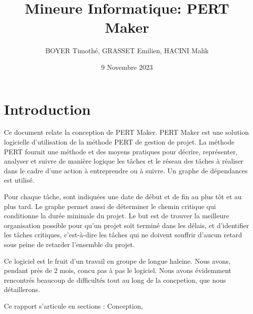 \documentclass{article}
\title{\centering Mineure Informatique: 
PERT Maker}
\author{BOYER Timothé, GRASSET Emilien, HACINI Malik}
\date{9 Novembre 2023}
\begin{document}
    
    
    
    \maketitle
    \tableofcontents{}
    
    \section{Introduction}
    
    Ce document relate la conception de PERT Maker.
    PERT Maker est une solution logicielle d'utilisation de la méthode PERT de gestion de projet.
    La méthode PERT fournit une méthode et des moyens pratiques pour décrire,
    représenter, analyser et suivre de manière logique les tâches et le réseau des tâches à réaliser dans le cadre d'une 
    action à entreprendre ou à suivre.
    Un graphe de dépendances est utilisé. 
    
    Pour chaque tâche, sont indiquées une date de début et de fin au plus tôt et au plus tard. 
    Le graphe permet aussi de déterminer le chemin critique qui conditionne la durée minimale du projet.
    Le but est de trouver la meilleure organisation possible pour qu'un projet soit terminé dans les délais, et d'identifier les tâches critiques, 
    c'est-à-dire les tâches qui ne doivent souffrir d'aucun retard sous peine de retarder l'ensemble du projet.

    Ce logiciel est le fruit d'un travail en groupe de longue haleine. Nous avons, pendant près de 2 mois, concu pas à pas le logiciel.
    Nous avons évidemment rencontrés beaucoup de difficultés tout au long de la concpetion, que nous détaillerons.

    Ce rapport s'articule en sections : Conception, 
    
\end{document}
